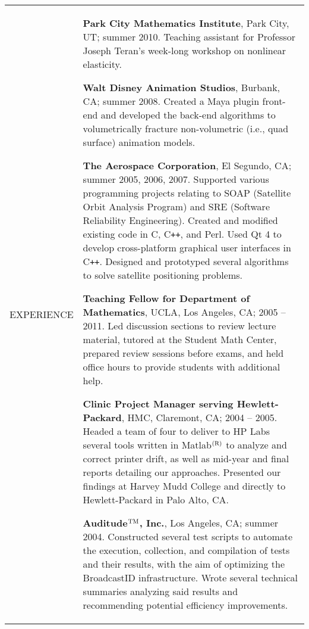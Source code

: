 \documentclass{article}
\begin{document}
\begin{center}
\vspace{\VS}

\begin{tabular}{@{}p{\CWa\columnwidth}@{}p{\CWb\columnwidth}@{}}
{\small EXPERIENCE} &
\begin{minipage}[t]{\CWb\columnwidth}
\par \textbf{Park City Mathematics Institute}, Park City, UT; summer 2010. Teaching assistant for Professor Joseph Teran's week-long workshop on nonlinear elasticity.
\par \textbf{Walt Disney Animation Studios}, Burbank, CA; summer 2008. Created a Maya plugin front-end and developed the back-end algorithms to volumetrically fracture non-volumetric (i.e., quad surface) animation models.
\vspace{\VSEX}
\par \textbf{The Aerospace Corporation}, El Segundo, CA; summer 2005, 2006, 2007. Supported various programming projects relating to SOAP (Satellite Orbit Analysis Program) and SRE (Software Reliability Engineering). Created and modified existing code in C, C{\tt ++}, and Perl. Used Qt 4 to develop cross-platform graphical user interfaces in C{\tt ++}. Designed and prototyped several algorithms to solve satellite positioning problems.
\vspace{\VSEX}
\par \textbf{Teaching Fellow for Department of Mathematics}, UCLA, Los Angeles, CA; 2005 -- 2011. Led discussion sections to review lecture material, tutored at the Student Math Center, prepared review sessions before exams, and held office hours to provide students with additional help. %
\vspace{\VSEX}
\par \textbf{Clinic Project Manager serving Hewlett-Packard}, HMC, Claremont, CA; 2004 -- 2005. Headed a team of four to deliver to HP Labs several tools written in Matlab$^{\rm (R)}$ to analyze and correct printer drift, as well as mid-year and final reports detailing our approaches. Presented our findings at Harvey Mudd College and directly to Hewlett-Packard in Palo Alto, CA.
\vspace{\VSEX}
\par \textbf{Auditude$^{\rm TM}$, Inc.}, Los Angeles, CA; summer 2004. Constructed several test scripts to automate the execution, collection, and compilation of tests and their results, with the aim of optimizing the BroadcastID infrastructure. Wrote several technical summaries analyzing said results and recommending potential efficiency improvements.

\end{minipage}
\end{tabular}
\end{center}
\end{document}
